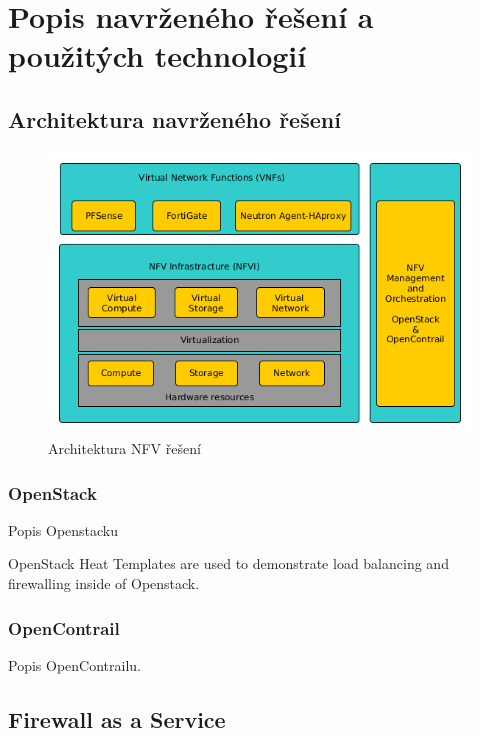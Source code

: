 \chapter{Popis navrženého řešení a použitých technologií}


\section{Architektura navrženého řešení}


\begin{figure}[h]
\begin{centering}
\includegraphics[scale=0.51]{images/VNF_overview}
\par\end{centering}
\caption{Architektura NFV řešení\label{fig:VNF_overview}}
\end{figure}


\subsection{OpenStack}\label{sub:interaction}

Popis Openstacku

OpenStack Heat Templates are used to demonstrate load balancing and firewalling inside of Openstack.

\subsection{OpenContrail}\label{sub:interaction}

Popis OpenContrailu.


\section{Firewall as a Service}


